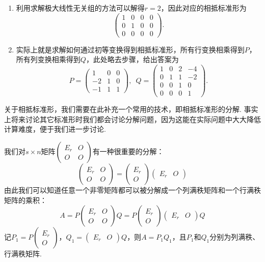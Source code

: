 \begin{solution}
    \begin{enumerate}
        \item 利用求解极大线性无关组的方法可以解得$r=2$，因此对应的相抵标准形为\[\begin{pmatrix}
            1 & 0 & 0 & 0 \\ 0 & 1 & 0 & 0 \\ 0 & 0 & 0 & 0
        \end{pmatrix}.\]

        \item 实际上就是求解如何通过初等变换得到相抵标准形，所有行变换相乘得到$P$，所有列变换相乘得到$Q$，此处略去步骤，给出答案为
        \[P=\begin{pmatrix}
            1 & 0 & 0 \\ -2 & 1 & 0 \\ -1 & 1 & 1
        \end{pmatrix},\enspace Q=\begin{pmatrix}
            1 & 0 & 2 & -4 \\ 0 & 1 & 1 & -2 \\ 0 & 0 & 1 & 0 \\ 0 & 0 & 0 & 1
        \end{pmatrix}.\]
    \end{enumerate}
\end{solution}

关于相抵标准形，我们需要在此补充一个常用的技术，即相抵标准形的分解. 事实上将来讨论其它标准形时我们都会讨论分解问题，因为这能在实际问题中大大降低计算难度，便于我们进一步讨论.

我们对$s \times n$矩阵$\begin{pmatrix}
        E_r & O \\ O & O
    \end{pmatrix}$有一种很重要的分解：
\[\begin{pmatrix}
        E_r & O \\ O & O
    \end{pmatrix}=\begin{pmatrix}
        E_r \\ O
    \end{pmatrix}\begin{pmatrix}
        E_r & O
    \end{pmatrix}\]
由此我们可以知道任意一个非零矩阵都可以被分解成一个列满秩矩阵和一个行满秩矩阵的乘积：
\[A=P\begin{pmatrix}
        E_r & O \\ O & O
    \end{pmatrix}Q=P\begin{pmatrix}
        E_r \\ O
    \end{pmatrix}\begin{pmatrix}
        E_r & O
    \end{pmatrix}Q\]
记$P_1=P\begin{pmatrix}
        E_r \\ O
    \end{pmatrix}$，$Q_1=\begin{pmatrix}
        E_r & O
    \end{pmatrix}Q$，则$A=P_1Q_1$，且$P_1$和$Q_1$分别为列满秩、行满秩矩阵.

